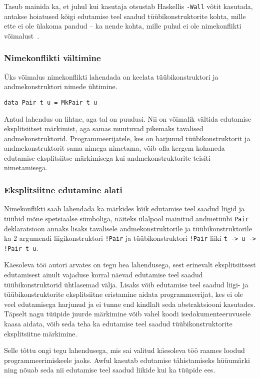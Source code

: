 \documentclass[12pt]{article}
\begin{document}
        Tasub mainida ka, et juhul kui kasutaja otsustab Haskellis \verb!-Wall! võtit kasutada, antakse hoiatused kõigi edutamise teel saadud tüübikonstruktorite kohta, mille ette ei ole ülakoma pandud -- ka nende kohta, mille puhul ei ole nimekonflikti võimalust~\cite{Gla}.
      \subsubsection{Nimekonflikti vältimine}
        Üks võimalus nimekonflikti lahendada on keelata tüübikonstruktori ja andmekonstruktori nimede ühtimine.

        \begin{verbatim}data Pair t u = MkPair t u\end{verbatim}

        Antud lahendus on lihtne, aga tal on puudusi. Nii on võimalik vältida edutamise eksplitsiitset märkimist, aga samas muutuvad pikemaks tavalised andmekonstruktorid. Programmeerijatele, kes on harjunud tüübikonstruktorit ja andmekonstruktorit sama nimega nimetama, võib olla kergem kohaneda edutamise eksplitsiitse märkimisega kui andmekonstruktorite teisiti nimetamisega.
      \subsubsection{Eksplitsiitne edutamine alati}
        Nimekonflikti saab lahendada ka märkides kõik edutamise teel saadud liigid ja tüübid mõne spetsiaalse sümboliga, näiteks ülalpool mainitud andmetüübi \verb!Pair! deklaratsioon annaks lisaks tavalisele andmekonstruktorile ja tüübikonstruktorile ka 2 argumendi liigikonstruktori \verb"!Pair" ja tüübikonstruktori \verb"!Pair" liiki \verb"t -> u -> !Pair t u".

        Käesoleva töö autori arvates on tegu hea lahendusega, sest erinevalt eksplitsiitsest edutamisest ainult vajaduse korral näevad edutamise teel saadud tüübikonstruktorid ühtlasemad välja. Lisaks võib edutamise teel saadud liigi- ja tüübikonstruktorite eksplitsiitne eristamine aidata programmeerijat, kes ei ole veel edutamisega harjunud ja ei tunne end kindlalt seda abstraktsiooni kasutades. Täpselt nagu tüüpide juurde märkimine võib vahel koodi isedokumenteeruvusele kaasa aidata, võib seda teha ka edutamise teel saadud tüübikonstruktorite eksplitsiitne märkimine.

        Selle tõttu ongi tegu lahendusega, mis sai valitud käesoleva töö raames loodud programmeerimiskeele jaoks. Awful kasutab edutamise tähistamiseks hüüumärki ning nõuab seda nii edutamise teel saadud liikide kui ka tüüpide ees.
\end{document}
